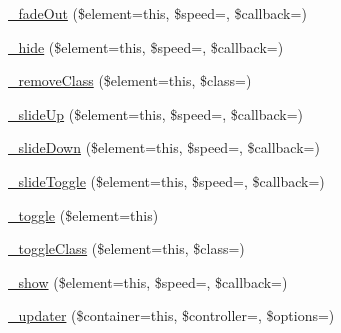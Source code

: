 \begin{DoxyCompactItemize}
\mbox{\hyperlink{class_c_i___jquery_ac4ea70b2bc309e7890933533f9558271}{\+\_\+fade\+Out}} (\$element=\textquotesingle{}this\textquotesingle{}, \$speed=\textquotesingle{}\textquotesingle{}, \$callback=\textquotesingle{}\textquotesingle{})
\item 
\mbox{\hyperlink{class_c_i___jquery_a6455866c894aa3f5f91106307e74af20}{\+\_\+hide}} (\$element=\textquotesingle{}this\textquotesingle{}, \$speed=\textquotesingle{}\textquotesingle{}, \$callback=\textquotesingle{}\textquotesingle{})
\item 
\mbox{\hyperlink{class_c_i___jquery_a4884288160d44b028f62be65704f6618}{\+\_\+remove\+Class}} (\$element=\textquotesingle{}this\textquotesingle{}, \$class=\textquotesingle{}\textquotesingle{})
\item 
\mbox{\hyperlink{class_c_i___jquery_a06cde38df4f5da8cea60e5af6bda3b07}{\+\_\+slide\+Up}} (\$element=\textquotesingle{}this\textquotesingle{}, \$speed=\textquotesingle{}\textquotesingle{}, \$callback=\textquotesingle{}\textquotesingle{})
\item 
\mbox{\hyperlink{class_c_i___jquery_ae33b3e32e5a1c20138f188fea7bbf44a}{\+\_\+slide\+Down}} (\$element=\textquotesingle{}this\textquotesingle{}, \$speed=\textquotesingle{}\textquotesingle{}, \$callback=\textquotesingle{}\textquotesingle{})
\item 
\mbox{\hyperlink{class_c_i___jquery_a10cc01f24e3e46e0dfc31833fe1c9629}{\+\_\+slide\+Toggle}} (\$element=\textquotesingle{}this\textquotesingle{}, \$speed=\textquotesingle{}\textquotesingle{}, \$callback=\textquotesingle{}\textquotesingle{})
\item 
\mbox{\hyperlink{class_c_i___jquery_a769e7876bde8beeca5c77f44cd8b65e4}{\+\_\+toggle}} (\$element=\textquotesingle{}this\textquotesingle{})
\item 
\mbox{\hyperlink{class_c_i___jquery_a1edd0a04c516c51a389d8b7f2b8eed71}{\+\_\+toggle\+Class}} (\$element=\textquotesingle{}this\textquotesingle{}, \$class=\textquotesingle{}\textquotesingle{})
\item 
\mbox{\hyperlink{class_c_i___jquery_af5cfcc4d5ee8426b68077ac721ccb988}{\+\_\+show}} (\$element=\textquotesingle{}this\textquotesingle{}, \$speed=\textquotesingle{}\textquotesingle{}, \$callback=\textquotesingle{}\textquotesingle{})
\item 
\mbox{\hyperlink{class_c_i___jquery_ada63d5e1f41e5779c5fd086710f74a1b}{\+\_\+updater}} (\$container=\textquotesingle{}this\textquotesingle{}, \$controller=\textquotesingle{}\textquotesingle{}, \$options=\textquotesingle{}\textquotesingle{})

\end{DoxyCompactItemize}

